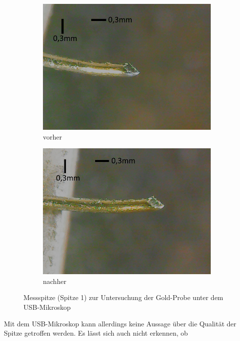 \begin{figure}[H]
    \centering
    \begin{subfigure}{0.45\textwidth}
        \centering
        \includegraphics[width=\linewidth]{../figs/spitze1_vorher}
        \caption{vorher}
    \end{subfigure}
    \begin{subfigure}{0.45\textwidth}
        \centering
        \includegraphics[width=\linewidth]{../figs/spitze1_nachher}
        \caption{nachher}
    \end{subfigure}
    \caption{Messspitze (Spitze 1) zur Untersuchung der Gold-Probe unter dem USB-Mikroskop}\label{fig:spitze1}
\end{figure} Mit dem USB-Mikroskop kann allerdings keine Aussage über die Qualität der Spitze getroffen werden. Es lässt sich auch nicht erkennen, ob
